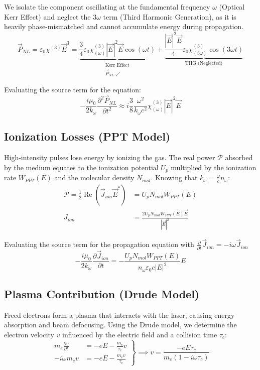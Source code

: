 \documentclass[11pt,a4paper]{article}
\begin{document}
We isolate the component oscillating at the fundamental frequency $\omega$ (Optical Kerr Effect) and neglect the $3\omega$ term (Third Harmonic Generation), as it is heavily phase-mismatched and cannot accumulate energy during propagation.
\begin{equation}
\vec{P}_{NL}=\varepsilon_0 \chi^{(3)} \vec{E}^3 = \underbrace{\frac{3}{4} \varepsilon_0 \chi^{(3)}_{(\omega)} |\vec{E}|^2 \vec{E} \cos(\omega t)}_{\substack{\text{Kerr Effect} \\ \vec{P}_{NL} \swarrow}} + \underbrace{\frac{|\vec{E}|^2 \vec{E}}{4} \varepsilon_0 \chi^{(3)}_{(3\omega)} \cos(3\omega t)}_{\text{THG (Neglected)}}
\end{equation}

Evaluating the source term for the equation:
\begin{equation}
- \frac{i \mu_0}{2 k_{\omega}} \frac{\partial^2 \vec{P}_{NL}}{\partial t^2} \approx i \frac{3}{8} \frac{\omega^2}{k_{\omega} c^2} \chi^{(3)}_{(\omega)} |\vec{E}|^2 \vec{E}
\end{equation}

\subsection*{Ionization Losses (PPT Model)}
High-intensity pulses lose energy by ionizing the gas. The real power $\mathcal{P}$ absorbed by the medium equates to the ionization potential $U_p$ multiplied by the ionization rate $W_{PPT}(E)$ and the molecular density $N_{mol}$. Knowing that $k_{\omega} = \frac{\omega}{c} n_{\omega}$:
\begin{align}
\mathcal{P} = \frac{1}{2} \operatorname{Re}(\vec{J}_{ion} \vec{E}^*) &= U_p N_{mol} W_{PPT}(E) \nonumber \\
J_{ion} &= \frac{2 U_p N_{mol} W_{PPT}(E) \vec{E}}{|\vec{E}|^2}
\end{align}

Evaluating the source term for the propagation equation with $\frac{\partial}{\partial t}\vec{J}_{ion} = -i\omega\vec{J}_{ion}$
\begin{equation}
- \frac{i \mu_0}{2 k_{\omega}} \frac{\partial \vec{J}_{ion}}{\partial t} = - \frac{U_p N_{mol} W_{PPT}(E)}{n_{\omega} \varepsilon_0 c |E|^2} E
\end{equation}

\subsection*{Plasma Contribution (Drude Model)}
Freed electrons form a plasma that interacts with the laser, causing energy absorption and beam defocusing. Using the Drude model, we determine the electron velocity $v$ influenced by the electric field and a collision time $\tau_c$:
\begin{equation*}
\left. \begin{aligned}
m_e \frac{\partial v}{\partial t} &= -e E - \frac{m_e}{\tau_c} v \\
- i \omega m_e v &= -e E - \frac{m_e v}{\tau_c}
\end{aligned} \right\} \implies v = \frac{-e E \tau_c}{m_e (1 - i \omega \tau_c)}
\end{equation*}
\end{document}
